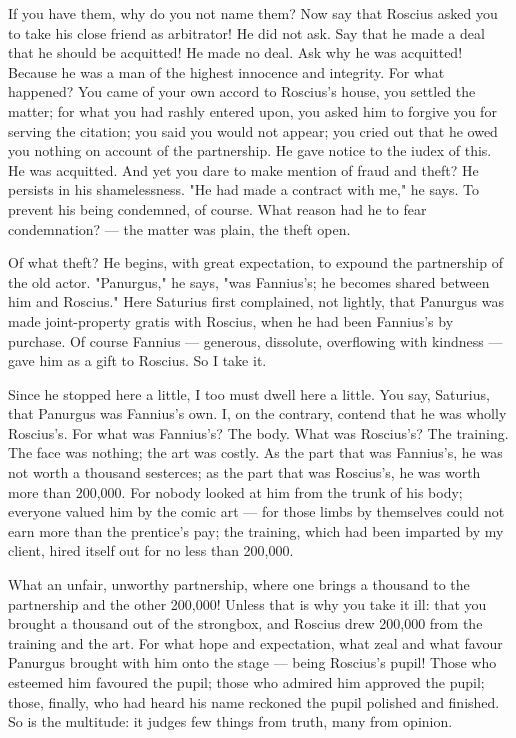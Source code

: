  If you have them, why do you not name them? Now say that Roscius asked you to take his close friend as arbitrator! He did not ask. Say that he made a deal that he should be acquitted! He made no deal. Ask why he was acquitted! Because he was a man of the highest innocence and integrity. For what happened? You came of your own accord to Roscius's house, you settled the matter; for what you had rashly entered upon, you asked him to forgive you for serving the citation; you said you would not appear; you cried out that he owed you nothing on account of the partnership. He gave notice to the iudex of this. He was acquitted. And yet you dare to make mention of fraud and theft? He persists in his shamelessness. "He had made a contract with me," he says. To prevent his being condemned, of course. What reason had he to fear condemnation? --- the matter was plain, the theft open.

 Of what theft? He begins, with great expectation, to expound the partnership of the old actor. "Panurgus," he says, "was Fannius's; he becomes shared between him and Roscius." Here Saturius first complained, not lightly, that Panurgus was made joint-property gratis with Roscius, when he had been Fannius's by purchase. Of course Fannius --- generous, dissolute, overflowing with kindness --- gave him as a gift to Roscius. So I take it.

 Since he stopped here a little, I too must dwell here a little. You say, Saturius, that Panurgus was Fannius's own. I, on the contrary, contend that he was wholly Roscius's. For what was Fannius's? The body. What was Roscius's? The training. The face was nothing; the art was costly. As the part that was Fannius's, he was not worth a thousand sesterces; as the part that was Roscius's, he was worth more than 200,000. For nobody looked at him from the trunk of his body; everyone valued him by the comic art --- for those limbs by themselves could not earn more than the prentice's pay; the training, which had been imparted by my client, hired itself out for no less than 200,000.

 What an unfair, unworthy partnership, where one brings a thousand to the partnership and the other 200,000! Unless that is why you take it ill: that you brought a thousand out of the strongbox, and Roscius drew 200,000 from the training and the art. For what hope and expectation, what zeal and what favour Panurgus brought with him onto the stage --- being Roscius's pupil! Those who esteemed him favoured the pupil; those who admired him approved the pupil; those, finally, who had heard his name reckoned the pupil polished and finished. So is the multitude: it judges few things from truth, many from opinion.

